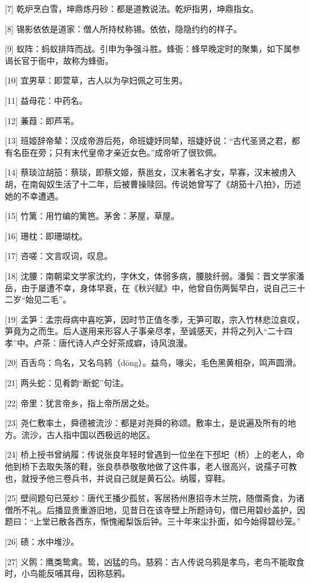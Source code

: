 \documentclass[12pt,UTF8]{ctexbook}
\begin{document}
[7] 乾炉烹白雪，坤鼎炼丹砂：都是道教说法。乾炉指男，坤鼎指女。

[8] 锡影依依是道家：僧人所持杖称锡。依依，隐隐约约的样子。

[9] 蚁阵：蚂蚁排阵而战。引申为争强斗胜。蜂衙：蜂早晚定时的聚集，如下属参谒长官于衙中，故称为蜂衙。

[10] 宜男草：即萱草，古人以为孕妇佩之可生男。

[11] 益母花：中药名。

[12] 蒹葭：即芦苇。

[13] 班姬辞帝辇：汉成帝游后苑，命班婕妤同辇，班婕妤说：“古代圣贤之君，都有名臣在旁；只有末代皇帝才亲近女色。”成帝听了很钦佩。

[14] 蔡琰泣胡笳：蔡琰，即蔡文姬，蔡邕女，汉末著名才女，早寡，汉末被虏入胡，在南匈奴生活了十二年，后被曹操赎回。传说她曾写了《胡笳十八拍》，历述她的不幸遭遇。

[15] 竹篱：用竹编的篱笆。茅舍：茅屋，草屋。

[16] 珊枕：即珊瑚枕。

[17] 咨嗟：文言叹词，叹息。

[18] 沈腰：南朝梁文学家沈约，字休文，体弱多病，腰肢纤弱。潘鬓：晋文学家潘岳，由于屡遭不幸，身体早衰，在《秋兴赋》中，他曾自伤两鬓早白，说自己三十二岁“始见二毛”。

[19] 孟笋：孟宗母病中喜吃笋，因时节正值冬季，无笋可取，宗入竹林悲泣哀叹，笋竟为之而生。后人遂用来形容人子事亲尽孝，至诚感天，并将之列入“二十四孝”中。卢茶：唐代诗人卢仝好茶成癖，诗风浪漫。

[20] 百舌鸟：鸟名，又名乌鸫（dōng）。益鸟，喙尖，毛色黑黄相杂，鸣声圆滑。

[21] 两头蛇：见肴韵“断蛇”句注。

[22] 帝里：犹言帝乡，指上帝所居之处。

[23] 尧仁敷率土，舜德被流沙：都是对尧舜的称颂。敷率土，是说遍及所有的地方。流沙，古人指中国以西极远的地区。

[24] 桥上授书曾纳履：传说张良年轻时曾遇到一位坐在下邳圯（桥）上的老人，命他到桥下去取失落的鞋，张良恭恭敬敬地做了这件事，老人很高兴，说孺子可教也，就授予他三卷兵书，并说自己就是黄石公。纳履，穿鞋。

[25] 壁间题句已笼纱：唐代王播少孤贫，客居扬州惠招寺木兰院，随僧斋食，为诸僧所不礼。后播显贵重游旧地，见昔日在该寺壁上所题诗句，僧已用碧纱盖护，因题曰：“上堂已散各西东，惭愧阇梨饭后钟。三十年来尘扑面，如今始得碧纱笼。”

[26] 碛：水中堆沙。

[27] 义鹘：鹰类鸷禽。鸷，凶猛的鸟。慈鸦：古人传说乌鸦是孝鸟，老鸟不能取食时，小鸟能反哺其母，因称慈鸦。
\end{document}
